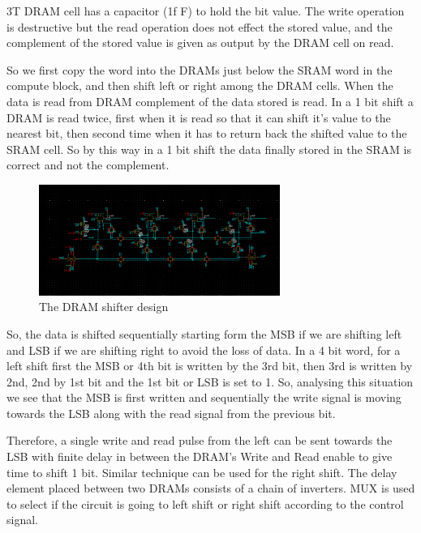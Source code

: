 3T DRAM cell has a capacitor (1f F) to hold the bit value. The write operation is destructive but the read operation does not effect the stored value, and the complement of the stored value is given as output by the DRAM cell on read.

So we first copy the word into the DRAMs just below the SRAM word in the compute block, and then shift left or right among the DRAM cells. When the data is read from DRAM complement of the data stored is read. In a 1 bit shift a DRAM is read twice, first when it is read so that it can shift it's value to the nearest bit, then second time when it has to return back the shifted value to the SRAM cell. So by this way in a 1 bit shift the data finally stored in the SRAM is correct and not the complement.

\begin{figure}[H]
\centering
\includegraphics[width=0.7\textwidth]{shift_blk.png}
\caption{The DRAM shifter design}
\label{fig:Figure}
\end{figure}

So, the data is shifted sequentially starting form the MSB if we are shifting left and LSB if we are shifting right to avoid the loss of data. In a 4 bit word, for a left shift first the MSB or 4th bit is written by the 3rd bit, then 3rd is written by 2nd, 2nd by 1st bit and the 1st bit or LSB is set to 1. So, analysing this situation we see that the MSB is first written and sequentially the write signal is moving towards the LSB along with the read signal from the previous bit. 

Therefore, a single write and read pulse from the left can be sent towards the LSB with finite delay in between the DRAM's Write and Read enable to give time to shift 1 bit. Similar technique can be used for the right shift. The delay element placed between two DRAMs consists of a chain of inverters. MUX is used to select if the circuit is going to left shift or right shift according to the control signal.

